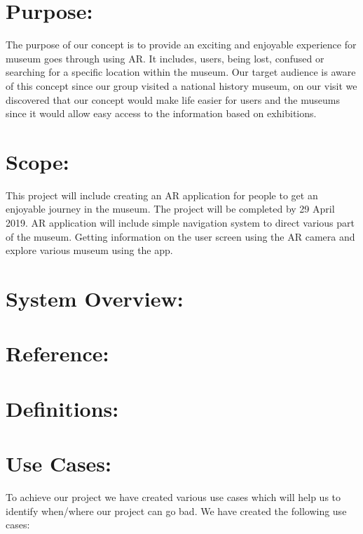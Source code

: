 
\section{Purpose:}
The purpose of our concept is to provide an exciting and enjoyable experience for museum goes through using AR. It includes, users, being lost, confused or searching for a specific location within the museum. Our target audience is aware of this concept since our group visited a national history museum, on our visit we discovered that our concept would make life easier for users and the museums since it would allow easy access to the information based on exhibitions.

\section{Scope:}
This project will include creating an AR application for people to get an enjoyable journey in the museum. The project will be completed by 29 April 2019. AR application will include simple navigation system to direct various part of the museum. Getting information on the user screen using the AR camera and explore various museum using the app. 

\section{System Overview:}

\section{Reference:}

\section{Definitions:}

\section{Use Cases:}
To achieve our project we have created various use cases which will help us to identify when/where our project can go bad. We have created the following use cases:

